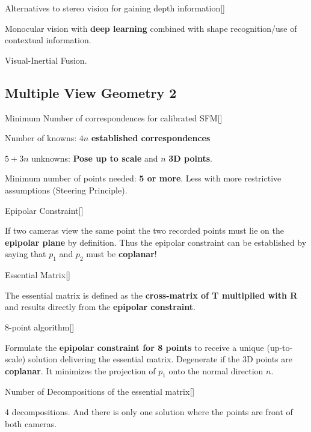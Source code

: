 \documentclass[10pt,a4paper]{scrartcl}
\begin{document}
\begin{multicols*}{2}
\begin{QandA}
{Alternatives to stereo vision for gaining depth information}[\Comparison]
\item Monocular vision with \textbf{deep learning} combined with shape recognition/use of contextual information.
\item Visual-Inertial Fusion.
\end{QandA}

\subsection*{Multiple View Geometry 2}

\begin{QandA}
{Minimum Number of correspondences for calibrated SFM}[\Application]
\item Number of knowns: $4n$ \textbf{established correspondences}
\item $5 + 3n$ unknowns: \textbf{Pose up to scale} and $n$ \textbf{3D points}.
\item Minimum number of points needed: \textbf{5 or more}. Less with more restrictive assumptions (Steering Principle).
\end{QandA}

\begin{QandA}
{Epipolar Constraint}[\Derivation]
\item If two cameras view the same point the two recorded points must lie on the \textbf{epipolar plane} by definition. Thus the epipolar constraint can be established by saying that $p_1$ and $p_2$ must be \textbf{coplanar}!
\end{QandA}

\begin{QandA}
{Essential Matrix}[\Definition]
\item The essential matrix is defined as the \textbf{cross-matrix of T multiplied with R} and results directly from the \textbf{epipolar constraint}.
\end{QandA}

\begin{QandA}
{8-point algorithm}[\Derivation]
\item Formulate the \textbf{epipolar constraint for 8 points} to receive a unique (up-to-scale) solution delivering the essential matrix. Degenerate if the 3D points are \textbf{coplanar}. It minimizes the projection of $p_1$ onto the normal direction $n$.
\end{QandA}

\begin{QandA}
{Number of Decompositions of the essential matrix}[\Application]
\item 4 decompositions. And there is only one solution where the points are front of both cameras.
\end{QandA}


\end{multicols*}
\end{document}

